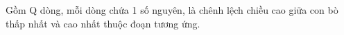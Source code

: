 Gồm Q dòng, mỗi dòng chứa 1 số nguyên, là chênh lệch chiều cao giữa con bò thấp nhất và cao nhất thuộc đoạn tương ứng.  

\